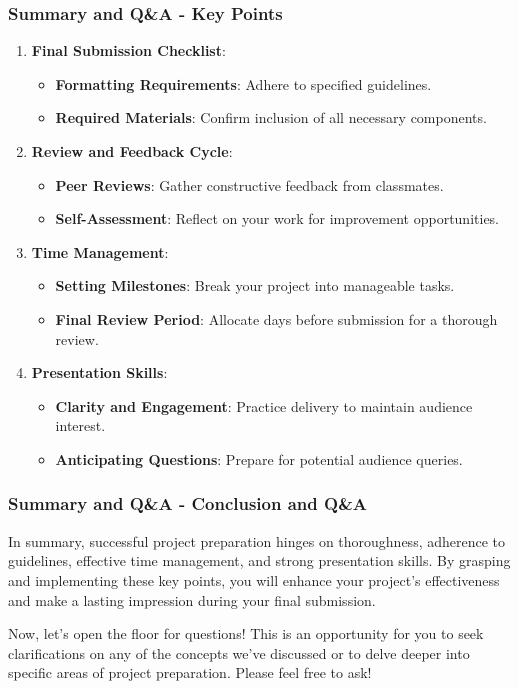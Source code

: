 \documentclass[aspectratio=169]{beamer}
\begin{document}
\begin{frame}[fragile]
    \frametitle{Summary and Q\&A - Key Points}
    \begin{enumerate}
        \item \textbf{Final Submission Checklist}:
        \begin{itemize}
            \item \textbf{Formatting Requirements}: Adhere to specified guidelines.
            \item \textbf{Required Materials}: Confirm inclusion of all necessary components.
        \end{itemize}
        
        \item \textbf{Review and Feedback Cycle}:
        \begin{itemize}
            \item \textbf{Peer Reviews}: Gather constructive feedback from classmates.
            \item \textbf{Self-Assessment}: Reflect on your work for improvement opportunities.
        \end{itemize}
        
        \item \textbf{Time Management}:
        \begin{itemize}
            \item \textbf{Setting Milestones}: Break your project into manageable tasks.
            \item \textbf{Final Review Period}: Allocate days before submission for a thorough review.
        \end{itemize}
        
        \item \textbf{Presentation Skills}:
        \begin{itemize}
            \item \textbf{Clarity and Engagement}: Practice delivery to maintain audience interest.
            \item \textbf{Anticipating Questions}: Prepare for potential audience queries.
        \end{itemize}
    \end{enumerate}
\end{frame}

\begin{frame}[fragile]
    \frametitle{Summary and Q\&A - Conclusion and Q\&A}
    In summary, successful project preparation hinges on thoroughness, adherence to guidelines, effective time management, and strong presentation skills. 
    By grasping and implementing these key points, you will enhance your project's effectiveness and make a lasting impression during your final submission.

    Now, let’s open the floor for questions! This is an opportunity for you to seek clarifications on any of the concepts we've discussed or to delve deeper into specific areas of project preparation. Please feel free to ask!
\end{frame}
\end{document}
